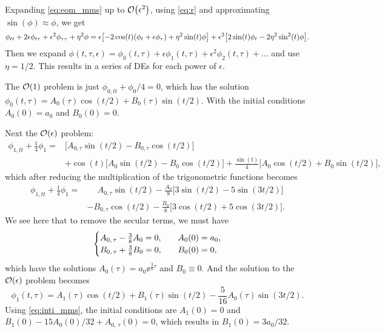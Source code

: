 \documentclass[10pt,letter, swedish, english,%
]{article}
\begin{document}
Expanding \eqref{eq:eom_mms} up to $\order{\epsilon^2}$, using
\eqref{eq:r} and approximating $\sin(\phi)\approx\phi$, we get
\begin{equation}
\phi_{tt}+2\epsilon\phi_{t\tau}+\epsilon^2\phi_{\tau\tau}+\eta^2\phi
=%
\epsilon\qty[-2\cos(t)(\phi_t+\epsilon\phi_\tau)+\eta^2\sin(t)\phi]
+\epsilon^2\qty[2\sin(t)\phi_t-2\eta^2\sin^2(t)\phi].
\end{equation}
Then we expand 
$\phi(t,\tau,\epsilon)=\phi_0(t,\tau)+
\epsilon\phi_1(t,\tau)+\epsilon^2\phi_2(t,\tau)+\ldots$ and use
$\eta=1/2$. This results in a series of DEs for each power of
$\epsilon$. 

The $\order{1}$ problem is just $\phi_{0,tt}+\phi_0/4=0$, which has the
solution
$\phi_0(t,\tau)=A_0(\tau)\cos(t/2)+B_0(\tau)\sin(t/2)$.
With the initial conditions $A_0(0)=a_0$ and $B_0(0)=0$.

Next the $\order{\epsilon}$ problem: 
\begin{equation}
\begin{aligned}
\phi_{1, tt}+\frac{1}{4}\phi_1=&\Big[A_{0,\tau}\sin(t/2)-B_{0, \tau}\cos(t/2)\Big]\\
&+\cos(t)\Big[A_0\sin(t/2)-B_0\cos(t/2)\Big]
+\frac{\sin(t)}{4}\Big[A_0\cos(t/2)+B_0\sin(t/2)\Big],
\end{aligned}
\end{equation}
which after reducing the multiplication of the trigonometric functions
becomes
\begin{equation}
\begin{aligned}
\phi_{1, tt}+\frac{1}{4}\phi_1=&\phantom{+}A_{0,\tau}\sin(t/2)
-\frac{A_0}{8}\Big[3\sin(t/2)-5\sin(3t/2)\Big]\\
&{-}B_{0, \tau}\cos(t/2)
-\frac{B_0}{8}\Big[3\cos(t/2)+5\cos(3t/2)\Big].
\end{aligned}
\end{equation}
We see here that to remove the secular terms, we must have
\begin{equation}
\begin{cases}
A_{0,\,\tau}-\frac{3}{8}A_0=0\qcomma&A_0(0)=a_0,\\
B_{0,\,\tau}+\frac{3}{8}B_0=0\qcomma&B_0(0)=0,
\end{cases}
\end{equation}
which have the solutions $A_0(\tau)=a_0\ee^{\frac{3}{8}\tau}$ and
$B_0\equiv0$. And the solution to the $\order{\epsilon}$ problem
becomes
\begin{equation}
\phi_1(t, \tau)=A_1(\tau)\cos(t/2)+B_1(\tau)\sin(t/2)
-\frac{5}{16}A_0(\tau)\sin(3t/2).
\end{equation}
Using \eqref{eq:inti_mms}, the initial conditions are $A_1(0)=0$ and
$B_1(0)-15A_0(0)/32 + A_{0,\,\tau}(0)=0$, which results in $B_1(0)=3a_0/32$.
\end{document}
